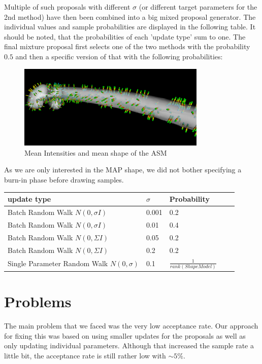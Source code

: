 \documentclass{article}
\begin{document}
	Multiple of such proposals with different $\sigma$ (or different target parameters for the 2nd method) have then been combined into a big mixed proposal generator.
	The individual values and sample probabilities are displayed in the following table.
	It should be noted, that the probabilities of each 'update type' sum to one.
	The final mixture proposal first selects one of the two methods with the probability $0.5$ and then a specific version of that with the following probabilities:
	\begin{figure}
		\centering
			\centering
			\includegraphics[width=0.8\textwidth]{images/mean_pixelintensities.png}
			\caption{Mean Intensities and mean shape of the ASM}
			\label{1.1}
	\end{figure}	
	As we are only interested in the MAP shape, we did not bother specifying a burn-in phase before drawing samples.

	\begin{center}
		\begin{tabular}{l l l l l}
			\toprule
			update type & $\sigma$ & Probability \\
			\midrule
			Batch Random Walk $N(0, \sigma I)$&  0.001 & 	0.2  	\\
			Batch Random Walk $N(0, \sigma I)$& 0.01 & 	0.4 	\\
			Batch Random Walk $N(0, \Sigma I)$& 0.05 &	0.2		\\
			Batch Random Walk $N(0, \Sigma I)$& 0.2&		0.2		\\
			Single Parameter Random Walk $N(0,\sigma)$ & 0.1& $\frac{1}{rank(ShapeModel)}$
		\end{tabular}
	\end{center}
	\section{Problems}
	The main problem that we faced was the very low acceptance rate.
	Our approach for fixing this was based on using smaller updates for the proposals as well as only updating individual parameters.
	Although that increased the sample rate a little bit, the acceptance rate is still rather low with $\sim 5\%$.
	
\end{document}
